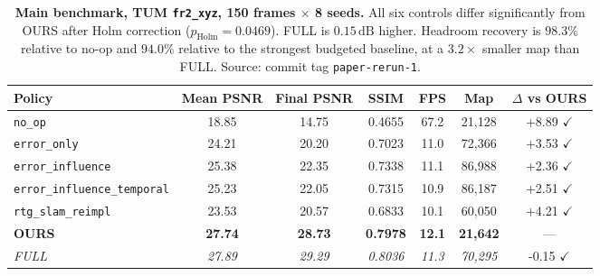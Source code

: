 \begin{table}[t]
\centering
\small
\begin{tabular}{lcccccc}
\toprule
\textbf{Policy} & \textbf{Mean PSNR} & \textbf{Final PSNR} & \textbf{SSIM} & \textbf{FPS} & \textbf{Map} & \textbf{$\Delta$ vs OURS} \\
\midrule
\texttt{no\_op} & 18.85 & 14.75 & 0.4655 & 67.2 & 21,128 & +8.89 $\checkmark$ \\
\texttt{error\_only} & 24.21 & 20.20 & 0.7023 & 11.0 & 72,366 & +3.53 $\checkmark$ \\
\texttt{error\_influence} & 25.38 & 22.35 & 0.7338 & 11.1 & 86,988 & +2.36 $\checkmark$ \\
\texttt{error\_influence\_temporal} & 25.23 & 22.05 & 0.7315 & 10.9 & 86,187 & +2.51 $\checkmark$ \\
\texttt{rtg\_slam\_reimpl} & 23.53 & 20.57 & 0.6833 & 10.1 & 60,050 & +4.21 $\checkmark$ \\
\textbf{OURS} & \textbf{27.74} & \textbf{28.73} & \textbf{0.7978} & \textbf{12.1} & \textbf{21,642} & --- \\
\textit{FULL} & \textit{27.89} & \textit{29.29} & \textit{0.8036} & \textit{11.3} & \textit{70,295} & -0.15 $\checkmark$ \\
\bottomrule
\end{tabular}
\caption{\textbf{Main benchmark, TUM \texttt{fr2\_xyz}, 150 frames $\times$ 8 seeds.} All six controls differ significantly from OURS after Holm correction ($p_{\mathrm{Holm}} = 0.0469$). FULL is $0.15\,\mathrm{dB}$ higher. Headroom recovery is $98.3\%$ relative to no-op and $94.0\%$ relative to the strongest budgeted baseline, at a $3.2\times$ smaller map than FULL. Source: commit tag \texttt{paper-rerun-1}.}
\label{tab:main}
\end{table}

